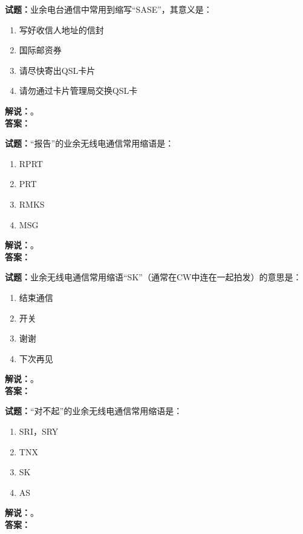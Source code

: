 \documentclass{ctexbook}
\begin{document}
\bigskip




\noindent\textbf{试题：}业余电台通信中常用到缩写“SASE”，其意义是：
\begin{enumerate}[leftmargin=3em]
\item 写好收信人地址的信封
\item 国际邮资券
\item 请尽快寄出QSL卡片
\item 请勿通过卡片管理局交换QSL卡
\end{enumerate}
\noindent\textbf{解说：}\textbf{}。\\\noindent\textbf{答案：}

\bigskip




\noindent\textbf{试题：}“报告”的业余无线电通信常用缩语是：
\begin{enumerate}[leftmargin=3em]
\item RPRT
\item PRT
\item RMKS
\item MSG
\end{enumerate}
\noindent\textbf{解说：}\textbf{}。\\\noindent\textbf{答案：}

\bigskip




\noindent\textbf{试题：}业余无线电通信常用缩语“SK”（通常在CW中连在一起拍发）的意思是：
\begin{enumerate}[leftmargin=3em]
\item 结束通信
\item 开关
\item 谢谢
\item 下次再见
\end{enumerate}
\noindent\textbf{解说：}\textbf{}。\\\noindent\textbf{答案：}

\bigskip




\noindent\textbf{试题：}“对不起”的业余无线电通信常用缩语是：
\begin{enumerate}[leftmargin=3em]
\item SRI，SRY
\item TNX
\item SK
\item AS
\end{enumerate}
\noindent\textbf{解说：}\textbf{}。\\\noindent\textbf{答案：}
\end{document}
